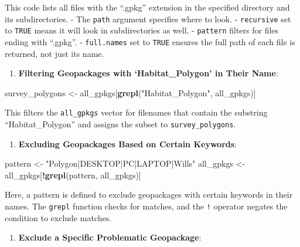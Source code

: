 \documentclass[
]{book}
\newenvironment{Shaded}{\begin{snugshade}}{\end{snugshade}}
\newcommand{\FunctionTok}[1]{\textcolor[rgb]{0.13,0.29,0.53}{\textbf{#1}}}
\newcommand{\NormalTok}[1]{#1}
\newcommand{\OtherTok}[1]{\textcolor[rgb]{0.56,0.35,0.01}{#1}}
\newcommand{\SpecialCharTok}[1]{\textcolor[rgb]{0.81,0.36,0.00}{\textbf{#1}}}
\newcommand{\StringTok}[1]{\textcolor[rgb]{0.31,0.60,0.02}{#1}}
\providecommand{\tightlist}{%
  \setlength{\itemsep}{0pt}\setlength{\parskip}{0pt}}
\theoremstyle{definition}
\theoremstyle{definition}
\theoremstyle{definition}
\theoremstyle{definition}
\theoremstyle{remark}
\begin{document}
This code lists all files with the ``.gpkg'' extension in the specified directory and its subdirectories.
- The \texttt{path} argument specifies where to look.
- \texttt{recursive} set to \texttt{TRUE} means it will look in subdirectories as well.
- \texttt{pattern} filters for files ending with ``.gpkg''.
- \texttt{full.names} set to \texttt{TRUE} ensures the full path of each file is returned, not just its name.

\begin{enumerate}
\def\labelenumi{\arabic{enumi}.}
\setcounter{enumi}{2}
\tightlist
\item
  \textbf{Filtering Geopackages with `Habitat\_Polygon' in Their Name}:
\end{enumerate}

\begin{Shaded}
\begin{Highlighting}[]
\NormalTok{   survey\_polygons }\OtherTok{\textless{}{-}}\NormalTok{ all\_gpkgs[}\FunctionTok{grepl}\NormalTok{(}\StringTok{"Habitat\_Polygon"}\NormalTok{, all\_gpkgs)]}
\end{Highlighting}
\end{Shaded}

This filters the \texttt{all\_gpkgs} vector for filenames that contain the substring ``Habitat\_Polygon'' and assigns the subset to \texttt{survey\_polygons}.

\begin{enumerate}
\def\labelenumi{\arabic{enumi}.}
\setcounter{enumi}{3}
\tightlist
\item
  \textbf{Excluding Geopackages Based on Certain Keywords}:
\end{enumerate}

\begin{Shaded}
\begin{Highlighting}[]
\NormalTok{   pattern }\OtherTok{\textless{}{-}} \StringTok{"Polygon|DESKTOP|PC|LAPTOP|Wills"}
\NormalTok{   all\_gpkgs }\OtherTok{\textless{}{-}}\NormalTok{ all\_gpkgs[}\SpecialCharTok{!}\FunctionTok{grepl}\NormalTok{(pattern, all\_gpkgs)]}
\end{Highlighting}
\end{Shaded}

Here, a pattern is defined to exclude geopackages with certain keywords in their names. The \texttt{grepl} function checks for matches, and the \texttt{!} operator negates the condition to exclude matches.

\begin{enumerate}
\def\labelenumi{\arabic{enumi}.}
\setcounter{enumi}{4}
\tightlist
\item
  \textbf{Exclude a Specific Problematic Geopackage}:
\end{enumerate}
\end{document}
